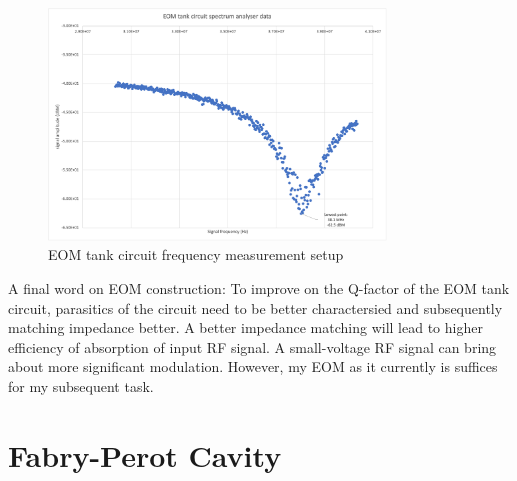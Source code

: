 \documentclass[12pt]{report}
\begin{document}
\begin{figure}[H]
    \centering
    \includegraphics[width=0.8\textwidth]{EOMfrequencyMeasurement.png}
    \caption{EOM tank circuit frequency measurement setup}
    \label{fig:EOMfrequencyMeasurement}
\end{figure}

A final word on EOM construction: To improve on the Q-factor of the EOM tank circuit, parasitics of the circuit need to be better charactersied and subsequently matching impedance better. A better impedance matching will lead to higher efficiency of absorption of input RF signal. A small-voltage RF signal can bring about more significant modulation. However, my EOM as it currently is suffices for my subsequent task. 

\section{Fabry-Perot Cavity}
\end{document}
